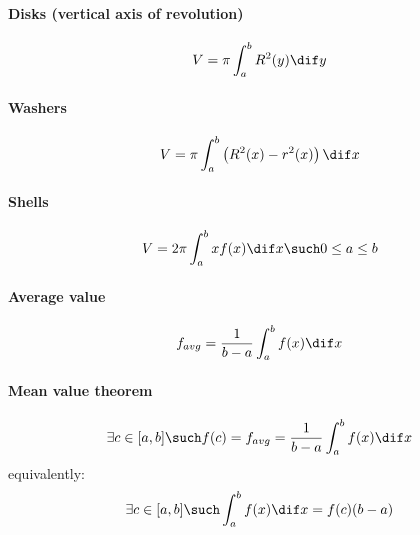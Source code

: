 \paragraph{Disks (vertical axis of revolution)}
	\begin{equation}
		V = \pi \int_a^b R^2(y) \dif y
	\end{equation}
\paragraph{Washers}
	\begin{equation}
		V = \pi \int_a^b \left( R^2(x) - r^2(x) \right) \dif x
	\end{equation}
\paragraph{Shells}
	\begin{equation}
		V = 2\pi \int_a^b xf(x) \dif x \such 0 \leq a \leq b
	\end{equation}
\paragraph{Average value}
	\begin{equation}
		f_{avg} = \frac{1}{b-a} \int_a^b f(x) \dif x
	\end{equation}
\paragraph{Mean value theorem}
	\begin{equation}
		\exists c \in [a,b] \such f(c) = f_{avg} = \frac{1}{b-a} \int_a^b f(x) \dif x
	\end{equation}
	equivalently:
	\begin{equation}
		\exists c \in [a,b] \such \int_a^b f(x) \dif x = f(c) (b-a)
	\end{equation}
